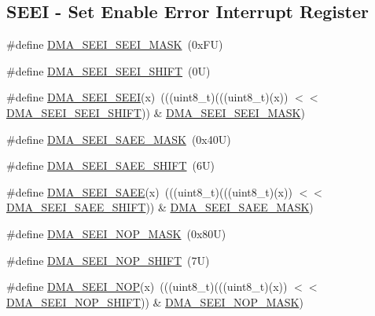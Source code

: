 \subsection*{S\+E\+EI -\/ Set Enable Error Interrupt Register}
\begin{DoxyCompactItemize}
\item 
\#define \mbox{\hyperlink{group___d_m_a___register___masks_ga67059eac1eff574cd4934a35a0476015}{D\+M\+A\+\_\+\+S\+E\+E\+I\+\_\+\+S\+E\+E\+I\+\_\+\+M\+A\+SK}}~(0x\+F\+U)
\item 
\#define \mbox{\hyperlink{group___d_m_a___register___masks_ga8d58d06faafb79d99b17b5694f3d18e5}{D\+M\+A\+\_\+\+S\+E\+E\+I\+\_\+\+S\+E\+E\+I\+\_\+\+S\+H\+I\+FT}}~(0\+U)
\item 
\#define \mbox{\hyperlink{group___d_m_a___register___masks_ga5e1057a8a3c0471a410d748cd532cce3}{D\+M\+A\+\_\+\+S\+E\+E\+I\+\_\+\+S\+E\+EI}}(x)~(((uint8\+\_\+t)(((uint8\+\_\+t)(x)) $<$$<$ \mbox{\hyperlink{group___d_m_a___register___masks_ga8d58d06faafb79d99b17b5694f3d18e5}{D\+M\+A\+\_\+\+S\+E\+E\+I\+\_\+\+S\+E\+E\+I\+\_\+\+S\+H\+I\+FT}})) \& \mbox{\hyperlink{group___d_m_a___register___masks_ga67059eac1eff574cd4934a35a0476015}{D\+M\+A\+\_\+\+S\+E\+E\+I\+\_\+\+S\+E\+E\+I\+\_\+\+M\+A\+SK}})
\item 
\#define \mbox{\hyperlink{group___d_m_a___register___masks_ga2d0a03f5b7e54876cc8a0af2251b1809}{D\+M\+A\+\_\+\+S\+E\+E\+I\+\_\+\+S\+A\+E\+E\+\_\+\+M\+A\+SK}}~(0x40\+U)
\item 
\#define \mbox{\hyperlink{group___d_m_a___register___masks_ga313d9b0f41aebf4cc2f6a5f1f730665b}{D\+M\+A\+\_\+\+S\+E\+E\+I\+\_\+\+S\+A\+E\+E\+\_\+\+S\+H\+I\+FT}}~(6\+U)
\item 
\#define \mbox{\hyperlink{group___d_m_a___register___masks_gaac543ddd4b89f5d1bcdf3e01580fc89a}{D\+M\+A\+\_\+\+S\+E\+E\+I\+\_\+\+S\+A\+EE}}(x)~(((uint8\+\_\+t)(((uint8\+\_\+t)(x)) $<$$<$ \mbox{\hyperlink{group___d_m_a___register___masks_ga313d9b0f41aebf4cc2f6a5f1f730665b}{D\+M\+A\+\_\+\+S\+E\+E\+I\+\_\+\+S\+A\+E\+E\+\_\+\+S\+H\+I\+FT}})) \& \mbox{\hyperlink{group___d_m_a___register___masks_ga2d0a03f5b7e54876cc8a0af2251b1809}{D\+M\+A\+\_\+\+S\+E\+E\+I\+\_\+\+S\+A\+E\+E\+\_\+\+M\+A\+SK}})
\item 
\#define \mbox{\hyperlink{group___d_m_a___register___masks_ga4561a1738dbf8013bd619fad65b0e216}{D\+M\+A\+\_\+\+S\+E\+E\+I\+\_\+\+N\+O\+P\+\_\+\+M\+A\+SK}}~(0x80\+U)
\item 
\#define \mbox{\hyperlink{group___d_m_a___register___masks_ga190051f9e53699e081f1b6f96f6890c8}{D\+M\+A\+\_\+\+S\+E\+E\+I\+\_\+\+N\+O\+P\+\_\+\+S\+H\+I\+FT}}~(7\+U)
\item 
\#define \mbox{\hyperlink{group___d_m_a___register___masks_ga301325edcc8ae50aa17ff5914e9bca46}{D\+M\+A\+\_\+\+S\+E\+E\+I\+\_\+\+N\+OP}}(x)~(((uint8\+\_\+t)(((uint8\+\_\+t)(x)) $<$$<$ \mbox{\hyperlink{group___d_m_a___register___masks_ga190051f9e53699e081f1b6f96f6890c8}{D\+M\+A\+\_\+\+S\+E\+E\+I\+\_\+\+N\+O\+P\+\_\+\+S\+H\+I\+FT}})) \& \mbox{\hyperlink{group___d_m_a___register___masks_ga4561a1738dbf8013bd619fad65b0e216}{D\+M\+A\+\_\+\+S\+E\+E\+I\+\_\+\+N\+O\+P\+\_\+\+M\+A\+SK}})
\end{DoxyCompactItemize}
